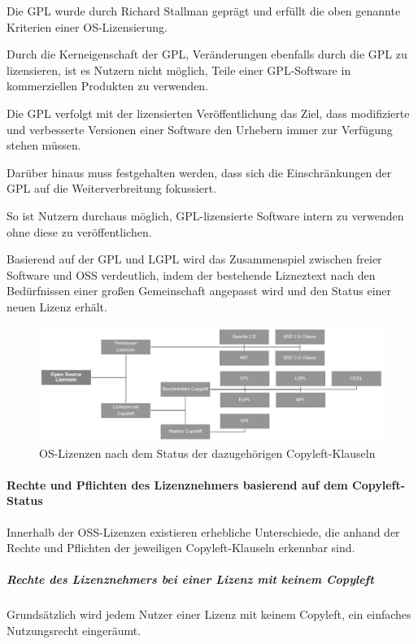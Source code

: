Die GPL wurde durch Richard Stallman geprägt und erfüllt die oben genannte Kriterien einer OS-Lizensierung. 

Durch die Kerneigenschaft der GPL, Veränderungen ebenfalls durch die GPL zu lizensieren, ist es Nutzern nicht möglich, Teile einer GPL-Software in kommerziellen Produkten zu verwenden. 

Die GPL verfolgt mit der lizensierten Veröffentlichung das Ziel, dass modifizierte und verbesserte Versionen einer Software den Urhebern immer zur Verfügung stehen müssen.  

Darüber hinaus muss festgehalten werden, dass sich die Einschränkungen der GPL auf die Weiterverbreitung fokussiert. 

So ist Nutzern durchaus möglich, GPL-lizensierte Software intern zu verwenden ohne diese zu veröffentlichen. 

Basierend auf der GPL und LGPL wird das Zusammenspiel zwischen freier Software und OSS verdeutlich, indem der bestehende Lizneztext nach den Bedürfnissen einer großen Gemeinschaft angepasst wird und den Status einer neuen Lizenz erhält.

\begin{figure}[h]
    \centering
    \includegraphics[scale=0.55]{Bilder/Lizenzenvarianten.png}
    \caption{OS-Lizenzen nach dem Status der dazugehörigen Copyleft-Klauseln}
\end{figure}

\paragraph{Rechte und Pflichten des Lizenznehmers basierend auf dem Copyleft-Status}
Innerhalb der OSS-Lizenzen existieren erhebliche Unterschiede, die anhand der Rechte und Pflichten der jeweiligen Copyleft-Klauseln erkennbar sind. 

\subparagraph{Rechte des Lizenznehmers bei einer Lizenz mit keinem Copyleft}
Grundsätzlich wird jedem Nutzer einer Lizenz mit keinem Copyleft, ein einfaches Nutzungsrecht eingeräumt. 


